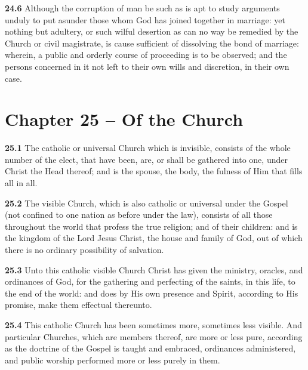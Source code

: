 \par\textbf{24.6} Although the corruption of man be such as is apt to study arguments unduly to put asunder those whom God has joined together in marriage: yet nothing but adultery, or such wilful desertion as can no way be remedied by the Church or civil magistrate, is cause sufficient of dissolving the bond of marriage: wherein, a public and orderly course of proceeding is to be observed; and the persons concerned in it not left to their own wills and discretion, in their own case.  

\section{Chapter 25 -- Of the Church}

\par\textbf{25.1} The catholic or universal Church which is invisible, consists of the whole number of the elect, that have been, are, or shall be gathered into one, under Christ the Head thereof; and is the spouse, the body, the fulness of Him that fills all in all.   

\par\textbf{25.2} The visible Church, which is also catholic or universal under the Gospel (not confined to one nation as before under the law), consists of all those throughout the world that profess the true religion; and of their children: and is the kingdom of the Lord Jesus Christ, the house and family of God, out of which there is no ordinary possibility of salvation.   

\par\textbf{25.3} Unto this catholic visible Church Christ has given the ministry, oracles, and ordinances of God, for the gathering and perfecting of the saints, in this life, to the end of the world: and does by His own presence and Spirit, according to His promise, make them effectual thereunto.   

\par\textbf{25.4} This catholic Church has been sometimes more, sometimes less visible. And particular Churches, which are members thereof, are more or less pure, according as the doctrine of the Gospel is taught and embraced, ordinances administered, and public worship performed more or less purely in them.   

